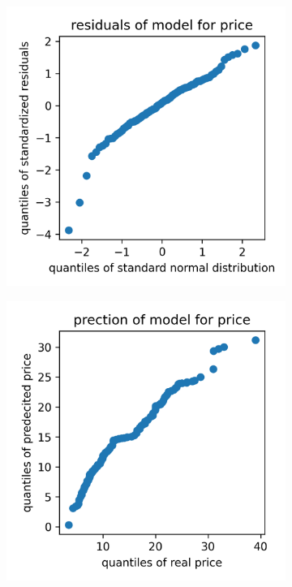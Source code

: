 \documentclass[12 pt]{scrartcl}
\begin{document}
\begin{figure}[htb]
  \centering

  \begin{subfigure}[b]{0.32\textwidth}
    \centering
    \includegraphics[width=\textwidth]{./images/qqplot_resz_price.png}
    \label{fig:qqplotreszprice}
  \end{subfigure}
  \begin{subfigure}[b]{0.32\textwidth}
    \centering
    \includegraphics[width=\textwidth]{./images/qqplot_yyhat_price.png}

\end{subfigure}
\end{figure}
\end{document}
